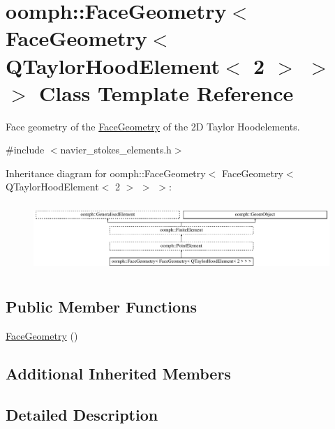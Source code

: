 \hypertarget{classoomph_1_1FaceGeometry_3_01FaceGeometry_3_01QTaylorHoodElement_3_012_01_4_01_4_01_4}{}\section{oomph\+:\+:Face\+Geometry$<$ Face\+Geometry$<$ Q\+Taylor\+Hood\+Element$<$ 2 $>$ $>$ $>$ Class Template Reference}
\label{classoomph_1_1FaceGeometry_3_01FaceGeometry_3_01QTaylorHoodElement_3_012_01_4_01_4_01_4}


Face geometry of the \hyperlink{classoomph_1_1FaceGeometry}{Face\+Geometry} of the 2D Taylor Hoodelements.  




{\ttfamily \#include $<$navier\+\_\+stokes\+\_\+elements.\+h$>$}

Inheritance diagram for oomph\+:\+:Face\+Geometry$<$ Face\+Geometry$<$ Q\+Taylor\+Hood\+Element$<$ 2 $>$ $>$ $>$\+:\begin{figure}[H]
\begin{center}
\leavevmode
\includegraphics[height=2.616822cm]{classoomph_1_1FaceGeometry_3_01FaceGeometry_3_01QTaylorHoodElement_3_012_01_4_01_4_01_4}
\end{center}
\end{figure}
\subsection*{Public Member Functions}
\begin{DoxyCompactItemize}
\item 
\hyperlink{classoomph_1_1FaceGeometry_3_01FaceGeometry_3_01QTaylorHoodElement_3_012_01_4_01_4_01_4_a88d96f17708ec8b3dd50587a99e7d5a9}{Face\+Geometry} ()
\end{DoxyCompactItemize}
\subsection*{Additional Inherited Members}


\subsection{Detailed Description}

